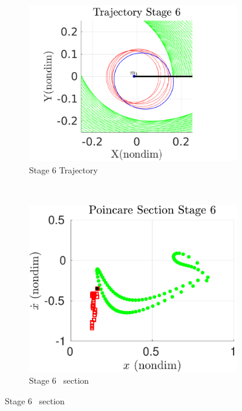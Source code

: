 \begin{figure}[htbp]
    \begin{subfigure}[htbp]{0.5\textwidth} 
        \includegraphics[width=\textwidth, keepaspectratio]{figures/2017_JAS/stage6_trajectory_zoom.pdf} 
        \caption{Stage 6 Trajectory~\label{fig:stage6_trajecotry_zoom}} 
    \end{subfigure}~
    \begin{subfigure}[htbp]{0.5\textwidth} 
        \includegraphics[width=\textwidth, keepaspectratio]{figures/2017_JAS/stage6_poincare.pdf} 
        \caption{Stage 6 \Poincare~section \label{fig:stage6_poincare}} 
    \end{subfigure}


\end{figure}
